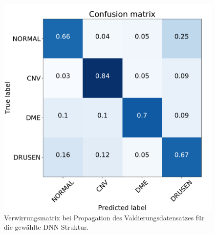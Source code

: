 \begin{figure}
\centering
 \includegraphics[width=.40\linewidth]{fig/Appendix_DNN/confusionmatrix6.pdf}
 \caption{Verwirrungsmatrix bei Propagation des Valdierungsdatensatzes für die gewählte DNN Struktur.}
\end{figure}
